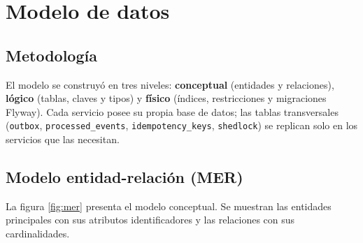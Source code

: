 \documentclass[conference]{IEEEtran}
\newcommand{\pkg}[1]{\texttt{#1}}
\begin{document}
\clearpage
\section{Modelo de datos}
\label{ch:datos}

\subsection{Metodología}

El modelo se construyó en tres niveles: \textbf{conceptual} (entidades y relaciones),
\textbf{lógico} (tablas, claves y tipos) y \textbf{físico} (índices, restricciones y
migraciones Flyway). Cada servicio posee su propia base de datos; las tablas transversales
(\pkg{outbox}, \pkg{processed\_events}, \pkg{idempotency\_keys}, \pkg{shedlock}) se replican
solo en los servicios que las necesitan.

\subsection{Modelo entidad-relación (MER)}

La figura \ref{fig:mer} presenta el modelo conceptual. Se muestran las entidades principales con
sus atributos identificadores y las relaciones con sus cardinalidades.
\end{document}
